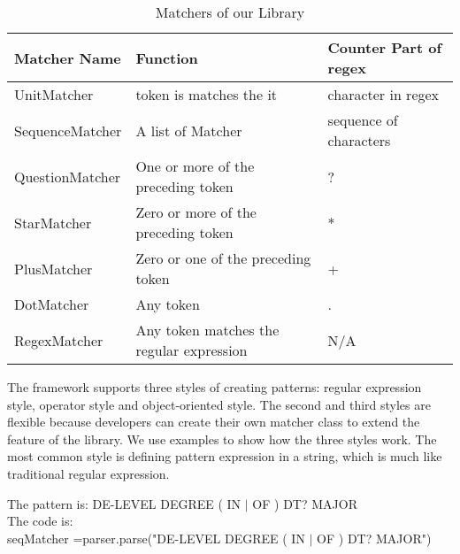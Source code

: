 \begin{table}[ht]
\caption{Matchers of our Library } %
\centering %
\begin{tabular}{  | l | l | l |  }
 \hline
 Matcher Name      &  Function                                 & Counter Part of regex    \\
 \hline
 UnitMatcher       &  token is matches the it                  & character  in regex       \\
 \hline
 SequenceMatcher   &  A list of Matcher                        & sequence of characters       \\
  \hline
 QuestionMatcher   &  One or more of the preceding token       & ?       \\
  \hline
 StarMatcher       &  Zero or more of the preceding token      & *       \\
  \hline
 PlusMatcher       &  Zero or one of the preceding token       & +       \\
  \hline
 DotMatcher        &  Any token                                & .      \\
  \hline
 RegexMatcher      &  Any token matches the regular expression               &  N/A      \\
  \hline
\end{tabular}
\label{tab:matchers} %
\end{table}


The framework supports three styles of creating patterns: regular expression style, operator style and object-oriented style. The second and third styles are flexible because developers can create their own matcher class to extend the feature of the library. We use examples to show how the three styles work. The most common style is defining pattern expression in a string, which is much like traditional regular expression.

\begin{framed}
\small
\noindent
The pattern is:  DE-LEVEL DEGREE ( IN  $\vert$  OF ) DT? MAJOR \\
The code is: \\
seqMatcher =parser.parse("DE-LEVEL DEGREE ( IN  $\vert$  OF ) DT? MAJOR")

\end{framed}

